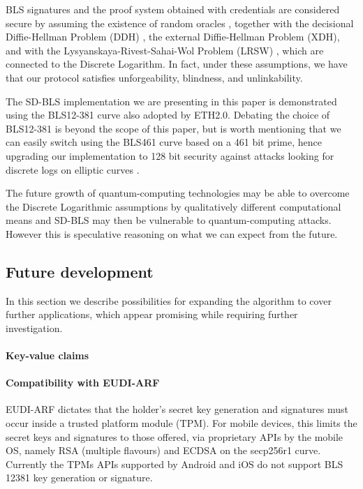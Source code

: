BLS signatures and the proof system obtained with credentials are
considered secure by assuming the existence of random oracles
\cite{random-oracle}, together with the decisional Diffie-Hellman
Problem (DDH) \cite{DDH-problem}, the external Diffie-Hellman Problem
(XDH), and with the Lysyanskaya-Rivest-Sahai-Wol Problem (LRSW)
\cite{lrsw-assumption}, which are connected to the Discrete
Logarithm. In fact, under these assumptions, we have that our protocol
satisfies unforgeability, blindness, and unlinkability.

The SD-BLS implementation we are presenting in this paper is
demonstrated using the BLS12-381 curve \cite{bls381-12} also adopted
by ETH2.0. Debating the choice of BLS12-381 is beyond the scope of
this paper, but is worth mentioning that we can easily switch using
the BLS461 curve based on a 461 bit prime, hence upgrading our
implementation to 128 bit security \cite{updating-key-pairings}
against attacks looking for discrete logs on elliptic curves
\cite{discrete-log-attack}.

The future growth of quantum-computing technologies may be able to
overcome the Discrete Logarithmic assumptions by qualitatively
different computational means and SD-BLS may then be vulnerable to
quantum-computing attacks. However this is speculative reasoning on
what we can expect from the future.

\subsection{Future development}

In this section we describe possibilities for expanding the algorithm
to cover further applications, which appear promising while requiring
further investigation.

\paragraph{Key-value claims}

\paragraph{Compatibility with EUDI-ARF}

EUDI-ARF dictates that the holder's secret key generation and
signatures must occur inside a trusted platform module (TPM). For
mobile devices, this limits the secret keys and signatures to those
offered, via proprietary APIs by the mobile OS, namely RSA (multiple
flavours) and ECDSA on the secp256r1 curve. Currently the TPMs APIs
supported by Android and iOS do not support BLS 12381 key generation
or signature.

